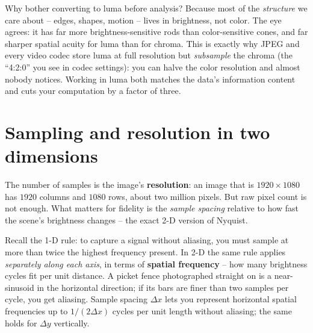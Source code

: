 \begin{whybox}
Why bother converting to luma before analysis? Because most of the
\emph{structure} we care about -- edges, shapes, motion -- lives in brightness,
not color. The eye agrees: it has far more brightness-sensitive rods than
color-sensitive cones, and far sharper spatial acuity for luma than for chroma.
This is exactly why JPEG and every video codec store luma at full resolution but
\emph{subsample} the chroma (the ``4:2:0'' you see in codec settings): you can
halve the color resolution and almost nobody notices. Working in luma both
matches the data's information content and cuts your computation by a factor of
three.
\end{whybox}

\section{Sampling and resolution in two dimensions}
\label{ch30:sampling}

The number of samples is the image's \textbf{resolution}: an image that is
$1920\times 1080$ has $1920$ columns and $1080$ rows, about two million pixels.
But raw pixel count is not enough. What matters for fidelity is the
\emph{sample spacing} relative to how fast the scene's brightness changes -- the
exact 2-D version of Nyquist.

Recall the 1-D rule: to capture a signal without aliasing, you must sample at
more than twice the highest frequency present. In 2-D the same rule applies
\emph{separately along each axis}, in terms of \textbf{spatial frequency} -- how
many brightness cycles fit per unit distance. A picket fence photographed
straight on is a near-sinusoid in the horizontal direction; if its bars are
finer than two samples per cycle, you get aliasing. Sample spacing $\Delta x$
lets you represent horizontal spatial frequencies up to
$1/(2\Delta x)$ cycles per unit length without aliasing; the same holds for
$\Delta y$ vertically.

